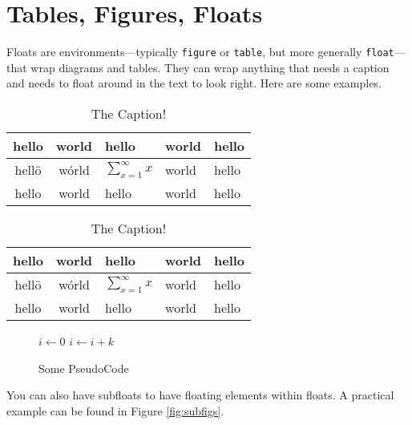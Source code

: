\documentclass{article}
\begin{document}
\section{Tables, Figures, Floats}
\label{sect:floats}

Floats are environments---typically \texttt{figure} or \texttt{table}, but
more generally \texttt{float}---that wrap diagrams and tables. They can wrap
anything that needs a caption and needs to float around in the text to look
right. Here are some examples.

\begin{table}[h]
  \centering
  \begin{tabular}{c|c|lll}
    hello & world & hello & world & hello \\
    \hline
    \hline
    hell\"{o} & w\'{o}rld & $\sum_{x=1}^\infty x$ & world & hello \\
    hello & world & hello & world & hello \\
  \end{tabular}
  \caption{The Caption!}
\end{table}

\begin{table}[h]
  \centering
  \caption{The Caption!}
  \begin{tabular}{c|c|lll}
    hello & world & hello & world & hello \\
    \hline
    \hline
    hell\"{o} & w\'{o}rld & $\sum_{x=1}^\infty x$ & world & hello \\
    hello & world & hello & world & hello \\
  \end{tabular}
  \label{tab:silly}
\end{table}

\begin{figure}[h]
  \centering
  \begin{algorithmic}
    \STATE $i\gets 0$
    \ELSE
    \STATE $i\gets i+k$
    \ENDIF
    \ENDIF
  \end{algorithmic}
  \caption{Some PseudoCode}
\end{figure}

You can also have subfloats to have floating elements within floats. A
practical example can be found in Figure \ref{fig:subfigs}.
\end{document}
